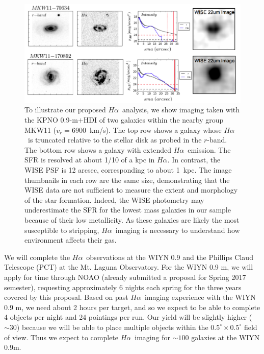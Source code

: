 \documentclass[11pt, preprint]{aastex}
\newcommand{\ha}{$H\alpha$}
\begin{document}
\begin{figure}[h]
\centering
\includegraphics[width=.85\textwidth]{HalphaProfileWISE.png}
\caption{\small
To illustrate our proposed \ha \  analysis, we show
imaging taken with the KPNO 0.9-m$+$HDI of two galaxies within the
nearby group  MKW11 ($v_r = 6900$~km/s). The top row shows a
galaxy whose \ha \ is truncated
relative to the stellar disk as
probed in the $r$-band. The bottom row shows a galaxy with extended
\ha \ emission.  The SFR is resolved  at about 1/10 of a kpc in \ha. In
contrast, the WISE PSF is 12 arcsec, corresponding to about 1~kpc. The image thumbnails in each row are the same size, demonstrating
that the WISE data are not sufficient to measure the extent and
morphology of the star formation.   Indeed, the WISE photometry may
underestimate the SFR for  the lowest mass galaxies in our sample
because of their low metallicity.  As these galaxies are likely the
most susceptible to stripping, \ha\ imaging is necessary to understand
how environment affects their gas.}
\label{fig3}
\end{figure}


We will complete the \ha \ observations at the WIYN 0.9 and the Phillips Claud Telescope (PCT) at the Mt. Laguna Observatory.  For the WIYN 0.9 m, we will apply for time through NOAO (already submitted a proposal for Spring 2017 semester), requesting
approximately 6 nights each spring for the three years covered by this
proposal.  Based on past \ha \ imaging experience with the WIYN 0.9 m,
we need about 2 hours per target, and so we expect to be able to
complete 4 objects per night and 24 pointings per run.  Our yield will 
be slightly higher ($\sim 30$) because we will be able to place multiple objects within
the $0.5^\circ \times 0.5^\circ$ field of view.  Thus we expect to
complete \ha \ imaging for
$\sim 100$ galaxies at the WIYN 0.9m. 
\end{document}
